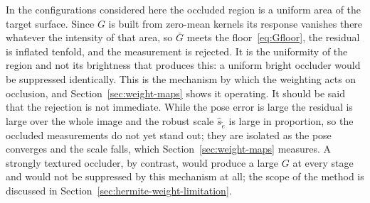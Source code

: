 In the configurations considered here the occluded region is a uniform area of
the target surface. Since $G$ is built from zero-mean kernels its response
vanishes there whatever the intensity of that area, so $\bar{G}$ meets the
floor~\eqref{eq:Gfloor}, the residual is inflated tenfold, and the
measurement is rejected. It is the uniformity of the region and not its
brightness that produces this: a uniform bright occluder would be suppressed
identically. This is the mechanism by which the weighting acts on occlusion,
and Section~\ref{sec:weight-maps} shows it operating. It should be said that
the rejection is not immediate. While the pose error is large the residual is
large over the whole image and the robust scale
$\hat{s}_{\tilde{e}}$ is large in proportion, so the occluded measurements do
not yet stand out; they are isolated as the pose converges and the scale
falls, which Section~\ref{sec:weight-maps} measures. A strongly textured
occluder, by contrast, would produce a large $G$ at every stage and would not
be suppressed by this mechanism at all; the scope of the method is discussed
in Section~\ref{sec:hermite-weight-limitation}.

%
%
%
